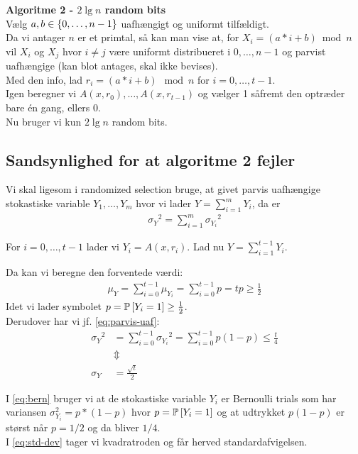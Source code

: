 \textbf{Algoritme 2 - $2 \lg n$ random bits}\\
Vælg $a, b \in \curly{0, \dots, n-1}$ uafhængigt og uniformt tilfældigt.\\

Da vi antager $n$ er et primtal, så kan man vise at, for $X_i = (a * i + b) \bmod n$ vil $X_i$ og $X_j$ hvor $i \neq j$ være uniformt distribueret i $0, \dots, n-1$ og parvist uafhængige (kan blot antages, skal ikke bevises).\\

Med den info, lad $r_i = (a * i + b) \mod n$ for $i = 0, \dots, t-1$.\\
Igen beregner vi $A(x, r_0), \dots, A(x, r_{t-1})$ og vælger 1 såfremt den optræder bare én gang, ellers 0.\\

Nu bruger vi kun $2 \lg n$ random bits.

\subsection{Sandsynlighed for at algoritme 2 fejler}
Vi skal ligesom i randomized selection bruge, at givet parvis uafhængige stokastiske variable $Y_1, \dots, Y_m$ hvor vi lader $Y = \sum_{i=1}^m Y_i$, da er
\begin{align}
  {\sigma_Y}^2 = \sum_{i=1}^m {\sigma_{Y_i}}^2 \label{eq:parvis-uaf}
\end{align}\vspace{2em}

For $i = 0, \dots, t-1$ lader vi $Y_i = A(x, r_i)$. Lad nu $Y = \sum_{i=1}^{t-1} Y_i$.

Da kan vi beregne den forventede værdi:
\begin{align}
  \mu_Y = \sum_{i=0}^{t-1} \mu_{Y_i} = \sum_{i=0}^{t-1} p = tp \geq \frac{1}{2} \label{eq:mu-y-ulighed}
\end{align}
Idet vi lader symbolet $p = \P{Y_i = 1} \geq \frac{1}{2}$.\\

Derudover har vi jf. \cref{eq:parvis-uaf}:
\begin{align}
  {\sigma_Y}^2
  &= \sum_{i=0}^{t-1} {\sigma_{Y_i}}^2
  = \sum_{i=0}^{t-1} p(1-p)
  \leq \frac{t}{4} \label{eq:bern} \\
  &\Updownarrow \nonumber  \\
  \sigma_Y &= \frac{\sqrt{t}}{2}  \label{eq:std-dev}
\end{align}

I \cref{eq:bern} bruger vi at de stokastiske variable $Y_i$ er Bernoulli trials som har variansen $\sigma_{Y_i}^2 = p*(1-p)$ hvor $p = \P{Y_i = 1}$ og at udtrykket $p(1 - p)$ er størst når $p = 1/2$ og da bliver $1/4$.\\
I \cref{eq:std-dev} tager vi kvadratroden og får herved standardafvigelsen.


